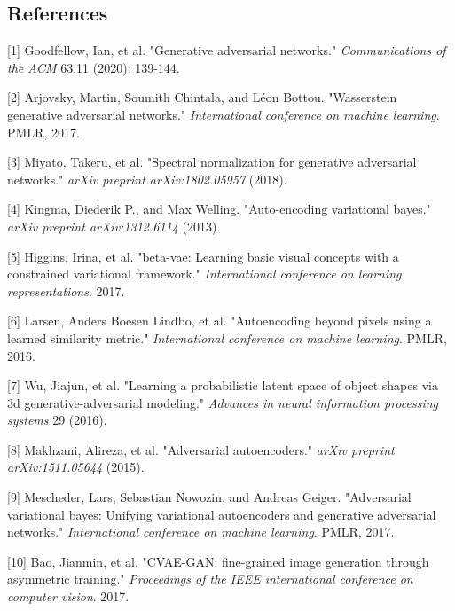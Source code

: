 \documentclass[
]{article}
\begin{document}
\begin{center}
\hypertarget{references}{%
\subsection{References}\label{references}}
\end{center}


{[}1{]} Goodfellow, Ian, et al. "Generative adversarial networks."
\emph{Communications of the ACM} 63.11 (2020): 139-144.

{[}2{]} Arjovsky, Martin, Soumith Chintala, and Léon Bottou.
"Wasserstein generative adversarial networks." \emph{International
conference on machine learning}. PMLR, 2017.

{[}3{]} Miyato, Takeru, et al. "Spectral normalization for generative
adversarial networks." \emph{arXiv preprint arXiv:1802.05957} (2018).

{[}4{]} Kingma, Diederik P., and Max Welling. "Auto-encoding variational
bayes." \emph{arXiv preprint arXiv:1312.6114} (2013).

{[}5{]} Higgins, Irina, et al. "beta-vae: Learning basic visual concepts
with a constrained variational framework." \emph{International
conference on learning representations}. 2017.

{[}6{]} Larsen, Anders Boesen Lindbo, et al. "Autoencoding beyond pixels
using a learned similarity metric." \emph{International conference on
machine learning}. PMLR, 2016.

{[}7{]} Wu, Jiajun, et al. "Learning a probabilistic latent space of
object shapes via 3d generative-adversarial modeling." \emph{Advances in
neural information processing systems} 29 (2016).

{[}8{]} Makhzani, Alireza, et al. "Adversarial autoencoders."
\emph{arXiv preprint arXiv:1511.05644} (2015).

{[}9{]} Mescheder, Lars, Sebastian Nowozin, and Andreas Geiger.
"Adversarial variational bayes: Unifying variational autoencoders and
generative adversarial networks." \emph{International conference on
machine learning}. PMLR, 2017.

{[}10{]} Bao, Jianmin, et al. "CVAE-GAN: fine-grained image generation
through asymmetric training." \emph{Proceedings of the IEEE
international conference on computer vision}. 2017.
\end{document}
